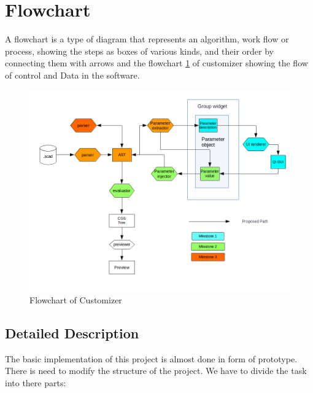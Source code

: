 \section{Flowchart}
A flowchart is a type of diagram that represents an algorithm, work flow or process, showing the steps as boxes of various kinds, and their order by connecting them with arrows
and the flowchart \ref{fig:FD1} of customizer showing the flow of control and Data in the software.

\begin{figure}
	\centering \includegraphics[scale=0.65]{images/flowchart.png}
	\caption{Flowchart of Customizer}
	\label{fig:FD1}
\end{figure}

\subsection{Detailed Description}

The basic implementation of this project is almost done in form of prototype. There is need to modify the structure of the project. We have to divide the task into there parts:

